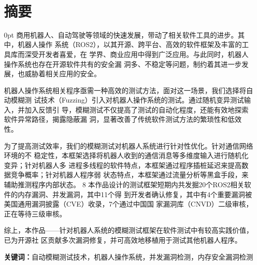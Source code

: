 \documentclass[zihao=-4]{ctexart}
\newcommand{\sanhao}{\fontsize{16pt}{0}}
\newcommand{\xiaosi}{\fontsize{12pt}{0}}
\newcommand{\setParDis}{\setlength {\parskip} {0pt} }
\begin{document}
\par \ 
\begin{center}
\sanhao
\centerline{\heiti{}}%
\end{center}



\renewcommand{\headrulewidth}{0pt}%
\clearpage
{} %

\xiaosi
\section*{摘要}
\begin{spacing}{1.5}
  \setParDis %
商用机器人、自动驾驶等领域的快速发展，带动了相关软件工具的进步。其中，机器人操作
系统（ROS2），以其开源、跨平台、高效的软件框架及丰富的工具库而深受开发者喜爱，在
学界、商业应用中得到广泛应用。与此同时，机器人操作系统也存在开源软件共有的安全漏
洞多、不稳定等问题，制约着其进一步发展，也威胁着相关应用的安全。

机器人操作系统相关程序亟需一种高效的测试方法，面对这一场景，我们选择将自动模糊测
试技术（Fuzzing）引入对机器人操作系统的测试。通过随机变异测试输入，并加入反馈引
导，模糊测试不仅提高了测试的自动化程度，还能有效地探索软件异常路径，揭露隐蔽漏
洞，显著改善了传统软件测试方法的繁琐性和低效性。

为了提高测试效率，我们的模糊测试对机器人系统进行针对性优化。针对通信网络环境的不
稳定性，本框架选择将机器人收到的通信消息等多维度输入进行随机化变异；针对机器人多
进程多线程的软件特点，本框架通过程序插桩延迟来提高数据竞争概率；针对机器人程序弱
状态特点，本框架通过流量分析等黑盒手段，来辅助推测程序内部状态。
8
本作品设计的测试框架短期内共发掘20个ROS2相关软件的内存漏洞、并发漏洞，其中11个得
到开发者确认修复，其中有4个重要漏洞被美国通用漏洞披露（CVE）收录，7个通过中国国
家漏洞库（CNVD）二级审核，正在等待三级审核。

综上，本作品——针对机器人系统的模糊测试框架在软件测试中有较高实践价值，已为开源社
区贡献多次漏洞修复，并可高效地移植用于测试其他机器人程序。


\end{spacing}
    
\textbf{关键词：}自动模糊测试技术，机器人操作系统，并发漏洞检测，内存安全漏洞检测

\newpage
\end{document}
